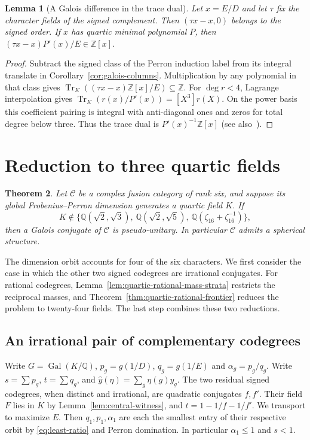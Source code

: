 \documentclass[11pt,reqno]{amsart}
\newtheorem{theorem}{Theorem}[section]
\newtheorem{lemma}[theorem]{Lemma}
\theoremstyle{remark}\newtheorem{remark}[theorem]{Remark}
\numberwithin{equation}{section}
\begin{document}
\begin{lemma}[A Galois difference in the trace dual]\label{thm:primitive-divisibility}
Let $x=E/D$ and let $\tau$ fix the character fields of the signed
complement. Then $(\tau x-x,0)$ belongs to the signed order.
If $x$ has quartic minimal polynomial $P$, then
$(\tau x-x)P'(x)/E\in\mathbb Z[x]$.
\end{lemma}
\begin{proof}
Subtract the signed class of the Perron induction label from its
integral translate in Corollary~\ref{cor:galois-columns}.
Multiplication by any polynomial in that class gives
$\operatorname{Tr}_K((\tau x-x)\mathbb Z[x]/E)\subseteq\mathbb Z$.
For $\deg r<4$, Lagrange interpolation gives
$\operatorname{Tr}_K(r(x)/P'(x))=[X^3]r(X)$. On the power basis
this coefficient pairing is integral with anti-diagonal ones and
zeros for total degree below three. Thus the trace dual is
$P'(x)^{-1}\mathbb Z[x]$ (see also~\cite{Narkiewicz}).
\end{proof}

\section{Reduction to three quartic fields}\label{sec:guide-quarticred}
\begin{theorem}\label{thm:quartic-final}
Let $\mathcal C$ be a complex fusion category of rank six, and suppose its global Frobenius--Perron dimension generates a quartic field $K$. If
\[
 K\notin\{\mathbb Q(\sqrt2,\sqrt3),\ \mathbb Q(\sqrt2,\sqrt5),\ \mathbb Q(\zeta_{16}+\zeta_{16}^{-1})\},
\]
then a Galois conjugate of $\mathcal C$ is pseudo-unitary. In particular $\mathcal C$ admits a spherical structure.
\end{theorem}

The dimension orbit accounts for four of the six characters. We first
consider the case in which the other two signed codegrees are irrational
conjugates. For rational codegrees, Lemma~\ref{lem:quartic-rational-mass-strata}
restricts the reciprocal masses, and Theorem~\ref{thm:quartic-rational-frontier}
reduces the problem to twenty-four fields. The last step combines
these two reductions.

\subsection{An irrational pair of complementary codegrees}
\label{sec:quartic-fourier-preliminaries}
Write $G=\operatorname{Gal}(K/\mathbb Q)$, $p_g=g(1/D)$,
$q_g=g(1/E)$ and $\alpha_g=p_g/q_g$. Write $s=\sum p_g$,
$t=\sum q_g$, and $\widehat y(\eta)=\sum_g\eta(g)y_g$.
The two residual signed codegrees, when distinct and irrational,
are quadratic conjugates $f,f'$. Their field $F$ lies in $K$ by
Lemma~\ref{lem:central-witness}, and $t=1-1/f-1/f'$.
We transport to maximize $E$. Then $q_1,p_1,\alpha_1$ are each
the smallest entry of their respective orbit by \eqref{eq:least-ratio}
and Perron domination. In particular $\alpha_1\le1$ and $s<1$.
\end{document}

